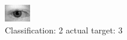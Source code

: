 \begin{figure}[h!]
\begin{center}
\includegraphics[width=0.60\columnwidth]{figures/ID557_class_2_target_3.png}
\end{center}
\caption{ Classification: 2 actual target: 3}
\label{fig:ID557_class_2_target_3}
\end{figure}
